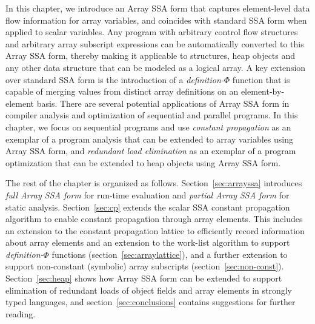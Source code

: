 In this chapter,
we introduce an Array SSA form 
that captures element-level data flow information for array variables, and
coincides with standard SSA form when applied to scalar variables.  
Any program with arbitrary control flow structures and arbitrary array
subscript expressions can be automatically converted to this 
Array SSA form, thereby making it applicable to structures, heap
objects and any other data structure
that can be modeled as a logical array.
A key extension over standard SSA form is the introduction of a
{\em definition-$\Phi$} function that is capable of
merging values from distinct array definitions on an element-by-element
basis. 
There are several potential applications of Array SSA form in compiler
analysis
and optimization of sequential and parallel programs.
In this chapter, we focus on sequential programs and use
{\em constant propagation}
as an exemplar of a program analysis that can be extended to array variables
using Array SSA form, and {\em redundant load elimination} as an
exemplar  of a program optimization that can be extended to heap objects using Array SSA form.

The rest of the chapter is organized as follows.
Section~\ref{sec:arrayssa} introduces {\em full Array SSA form} for run-time
evaluation and {\em partial Array SSA form}
for static analysis.  
Section~\ref{sec:cp} extends the scalar SSA
constant propagation algorithm to enable
constant propagation through array elements.
This includes an extension to the constant
propagation lattice to efficiently
record information about array
elements and an extension to the
work-list algorithm to support  {\em definition-$\Phi$} functions (section~\ref{sec:arraylattice}), and
a further extension to support non-constant (symbolic) array
subscripts (section~\ref{sec:non-const}). 
Section~\ref{sec:heap} shows how Array SSA form can be extended to
support elimination of redundant loads of 
object fields and array elements in strongly typed languages,
and section~\ref{sec:conclusions} contains suggestions for further reading.


